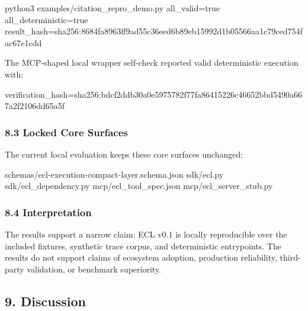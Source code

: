 \documentclass[
]{article}
\newenvironment{Shaded}{}{}
\newcommand{\NormalTok}[1]{#1}
\begin{document}
\begin{Shaded}
\begin{Highlighting}[]
\NormalTok{python3 examples/citation\_repro\_demo.py}
\NormalTok{all\_valid=true}
\NormalTok{all\_deterministic=true}
\NormalTok{result\_hash=sha256:8684fa8963ff9ad55c36eed6b89eb15992d1b05566aa1c79ced754fac67e1cdd}
\end{Highlighting}
\end{Shaded}

The MCP-shaped local wrapper self-check reported valid deterministic
execution with:

\begin{Shaded}
\begin{Highlighting}[]
\NormalTok{verification\_hash=sha256:bdcf2ddb30a0e5975782f77fa86415226c46652bbd5490a667a2f2106dd65a5f}
\end{Highlighting}
\end{Shaded}

\subsubsection{8.3 Locked Core Surfaces}\label{locked-core-surfaces}

The current local evaluation keeps these core surfaces unchanged:

\begin{Shaded}
\begin{Highlighting}[]
\NormalTok{schemas/ecl{-}execution{-}compact{-}layer.schema.json}
\NormalTok{sdk/ecl.py}
\NormalTok{sdk/ecl\_dependency.py}
\NormalTok{mcp/ecl\_tool\_spec.json}
\NormalTok{mcp/ecl\_server\_stub.py}
\end{Highlighting}
\end{Shaded}

\subsubsection{8.4 Interpretation}\label{interpretation}

The results support a narrow claim: ECL v0.1 is locally reproducible
over the included fixtures, synthetic trace corpus, and deterministic
entrypoints. The results do not support claims of ecosystem adoption,
production reliability, third-party validation, or benchmark
superiority.

\subsection{9. Discussion}\label{discussion}
\end{document}
